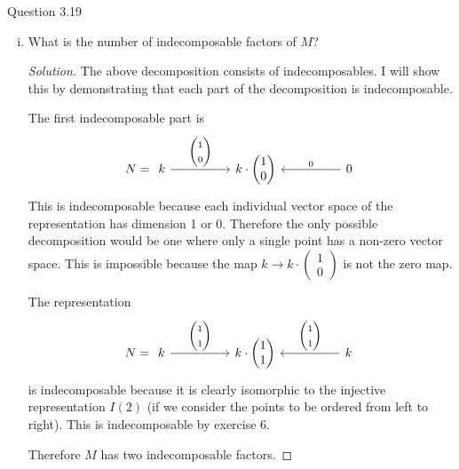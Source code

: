 \documentclass{article}
\newenvironment{question}[1][]{\begin{paragraph}{Question #1}}{\end{paragraph}}
\newenvironment{solution}{\begin{proof}[Solution]\renewcommand\qedsymbol{}}{\end{proof}}
\theoremstyle{definition}
\begin{document}
\begin{question}[3.19]
\begin{enumerate}[(i)]
        \item What is the number of indecomposable factors of \(M\)?

              \begin{solution}
                  The above decomposition consists of indecomposables. I will
                  show this by demonstrating that each part of the decomposition
                  is indecomposable.

                  The first indecomposable part is
                  \[
                      N=\begin{tikzcd}[ampersand replacement=\&]
                          k \&\& {k\cdot\begin{pmatrix}1\\0\end{pmatrix}} \&\& 0
                          \arrow["{\begin{pmatrix}1\\0\end{pmatrix}}", from=1-1, to=1-3]
                          \arrow["0"', from=1-5, to=1-3]
                      \end{tikzcd}
                  \]
                  This is indecomposable because each individual vector space of
                  the representation has dimension 1 or 0. Therefore the only
                  possible decomposition would be one where only a single point
                  has a non-zero vector space. This is impossible because the
                  map \(k\to k\cdot\begin{pmatrix}1\\0\end{pmatrix}\) is not the
                  zero map.

                  The representation
                  \[
                      N=\begin{tikzcd}[ampersand replacement=\&]
                          k \&\& {k\cdot\begin{pmatrix}1\\1\end{pmatrix}} \&\& k
                          \arrow["{\begin{pmatrix}1\\1\end{pmatrix}}", from=1-1, to=1-3]
                          \arrow["{\begin{pmatrix}1\\1\end{pmatrix}}"', from=1-5, to=1-3]
                      \end{tikzcd}
                  \]
                  is indecomposable because it is clearly isomorphic to the
                  injective representation \(I(2)\) (if we consider the points
                  to be ordered from left to right). This is indecomposable by
                  exercise 6.

                  Therefore \(M\) has two indecomposable factors.
              \end{solution}
    \end{enumerate}
\end{question}
\end{document}
